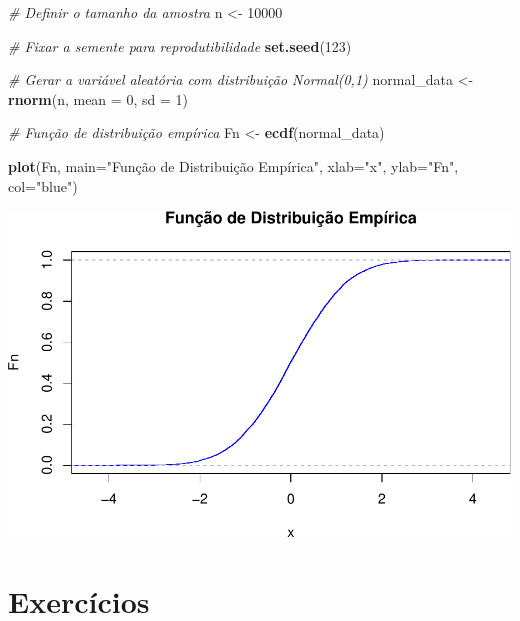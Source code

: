 \documentclass[
]{book}
\newenvironment{Shaded}{\begin{snugshade}}{\end{snugshade}}
\newcommand{\AttributeTok}[1]{\textcolor[rgb]{0.13,0.29,0.53}{#1}}
\newcommand{\CommentTok}[1]{\textcolor[rgb]{0.56,0.35,0.01}{\textit{#1}}}
\newcommand{\DecValTok}[1]{\textcolor[rgb]{0.00,0.00,0.81}{#1}}
\newcommand{\FunctionTok}[1]{\textcolor[rgb]{0.13,0.29,0.53}{\textbf{#1}}}
\newcommand{\NormalTok}[1]{#1}
\newcommand{\OtherTok}[1]{\textcolor[rgb]{0.56,0.35,0.01}{#1}}
\newcommand{\StringTok}[1]{\textcolor[rgb]{0.31,0.60,0.02}{#1}}
\begin{document}
\begin{Shaded}
\begin{Highlighting}[]
\CommentTok{\# Definir o tamanho da amostra}
\NormalTok{n }\OtherTok{\textless{}{-}} \DecValTok{10000}

\CommentTok{\# Fixar a semente para reprodutibilidade}
\FunctionTok{set.seed}\NormalTok{(}\DecValTok{123}\NormalTok{)}

\CommentTok{\# Gerar a variável aleatória com distribuição Normal(0,1)}
\NormalTok{normal\_data }\OtherTok{\textless{}{-}} \FunctionTok{rnorm}\NormalTok{(n, }\AttributeTok{mean =} \DecValTok{0}\NormalTok{, }\AttributeTok{sd =} \DecValTok{1}\NormalTok{)}

\CommentTok{\# Função de distribuição empírica}
\NormalTok{Fn }\OtherTok{\textless{}{-}} \FunctionTok{ecdf}\NormalTok{(normal\_data)}

\FunctionTok{plot}\NormalTok{(Fn, }\AttributeTok{main=}\StringTok{"Função de Distribuição Empírica"}\NormalTok{,}
     \AttributeTok{xlab=}\StringTok{"x"}\NormalTok{,}
     \AttributeTok{ylab=}\StringTok{"Fn"}\NormalTok{,}
     \AttributeTok{col=}\StringTok{"blue"}\NormalTok{)}
\end{Highlighting}
\end{Shaded}

\includegraphics{meuLivro2_files/figure-latex/unnamed-chunk-147-1.pdf}

\section{Exercícios}\label{exercuxedcios-12}
\end{document}
